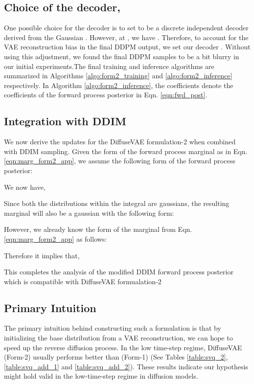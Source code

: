 \documentclass[10pt]{article} \usepackage[accepted]{tmlr}
\begin{document}
\noindent
\subsection{Choice of the decoder, }
One possible choice for the decoder is to set  to be a discrete independent decoder derived from the Gaussian  \citep{ho2020denoising}. However, at , we have . Therefore, to account for the VAE reconstruction bias in the final DDPM output, we set our decoder . Without using this adjustment, we found the final DDPM samples to be a bit blurry in our initial experiments.The final training and inference algorithms are summarized in Algorithms \ref{algo:form2_training} and \ref{algo:form2_inference} respectively. In Algorithm \ref{algo:form2_inference}, the coefficients  denote the coefficients of the forward process posterior in Eqn. \ref{eqn:fwd_post}.

\noindent
\subsection{Integration with DDIM}
We now derive the updates for the DiffuseVAE formulation-2 when combined with DDIM sampling. Given the form of the forward process marginal as in Eqn. \ref{eqn:marg_form2_app}, we assume the following form of the forward process posterior:




We now have,

Since both the distributions within the integral are gaussians, the resulting marginal will also be a gaussian with the following form:



However, we already know the form of the marginal  from Eqn. \ref{eqn:marg_form2_app} as follows:

Therefore it implies that,

This completes the analysis of the modified DDIM forward process posterior which is compatible with DiffuseVAE formualation-2
\noindent
\subsection{Primary Intuition}
The primary intuition behind constructing such a formulation is that by initializing the base distribution from a VAE reconstruction, we can hope to speed up the reverse diffusion process. In the low time-step regime, DiffuseVAE (Form-2) usually performs better than (Form-1) (See Tables \ref{table:svq_2}, \ref{table:svq_add_1}  and \ref{table:svq_add_2}). These results indicate our hypothesis might hold valid in the low-time-step regime in diffusion models.
\end{document}
